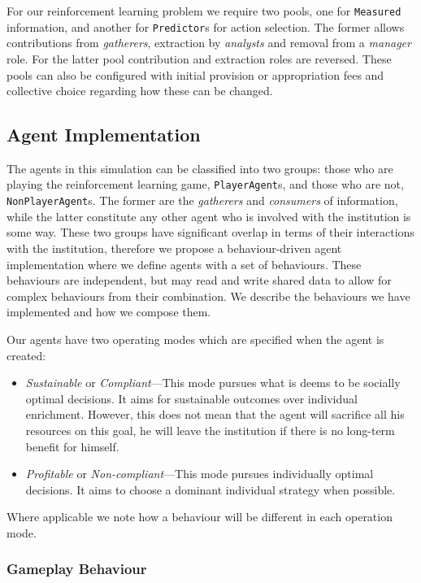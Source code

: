 For our reinforcement learning problem we require two pools, one for
\texttt{Measured} information, and another for \texttt{Predictor}s for action
selection. The former allows contributions from \emph{gatherers}, extraction
by \emph{analysts} and removal from a \emph{manager} role. For the latter pool
contribution and extraction roles are reversed. These pools can also be
configured with initial provision or appropriation fees and collective choice
regarding how these can be changed.

\subsection{Agent Implementation}

The agents in this simulation can be classified into two groups: those who are
playing the reinforcement learning game, \texttt{PlayerAgent}s, and those who
are not, \texttt{NonPlayerAgent}s. The former are the \emph{gatherers} and
\emph{consumers} of information, while the latter constitute any other agent
who is involved with the institution is some way. These two groups have
significant overlap in terms of their interactions with the institution,
therefore we propose a behaviour-driven agent implementation where we define
agents with a set of behaviours. These behaviours are independent, but may
read and write shared data to allow for complex behaviours from their
combination. We describe the behaviours we have implemented and how we compose
them.

Our agents have two operating modes which are specified when the agent is created:

\begin{itemize}
\item \emph{Sustainable} or \emph{Compliant}---This mode pursues what is deems to be socially optimal decisions. It aims for sustainable outcomes over individual enrichment. However, this does not mean that the agent will sacrifice all his resources on this goal, he will leave the institution if there is no long-term benefit for himself.
\item \emph{Profitable} or \emph{Non-compliant}---This mode pursues individually optimal decisions. It aims to choose a dominant individual strategy when possible.
\end{itemize}

Where applicable we note how a behaviour will be different in each operation mode.

\subsubsection*{Gameplay Behaviour}

